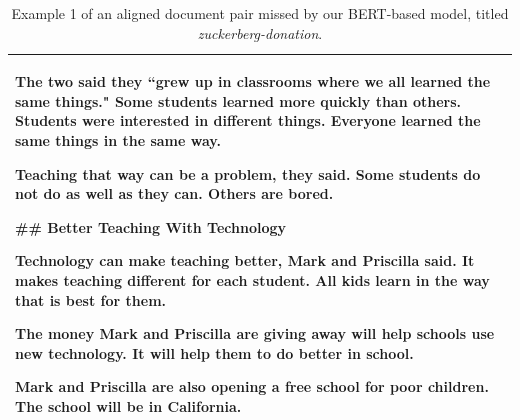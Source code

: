 \begin{table}
\begin{center}
\begin{tabular}{|L{14.7cm}|}
The two said they ``grew up in classrooms where we all learned the same things." Some students learned more quickly than others. Students were interested in different things. Everyone learned the same things in the same way.

Teaching that way can be a problem, they said. Some students do not do as well as they can. Others are bored.

\#\# Better Teaching With Technology

Technology can make teaching better, Mark and Priscilla said. It makes teaching different for each student. All kids learn in the way that is best for them.

The money Mark and Priscilla are giving away will help schools use new technology. It will help them to do better in school.

Mark and Priscilla are also opening a free school for poor children. The school will be in California. \\ \hline
\end{tabular}
\end{center}
\caption{\label{table:example1} Example 1 of an aligned document pair missed by our BERT-based model, titled \textit{zuckerberg-donation}.}
\end{table}


